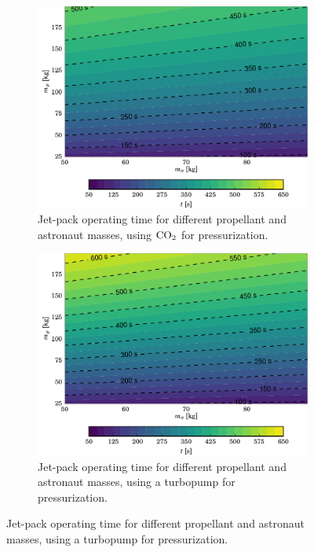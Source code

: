 \documentclass[twocolumn]{article}
\newcommand{\COtwo}{\textnormal{CO}_2}
\begin{document}
\begin{figure}
  \centering
  \begin{subfigure}{\textwidth}
    \includegraphics{img/delta_t_co2}
  \caption{Jet-pack operating time for different propellant and astronaut 
  masses, using $\COtwo$ for pressurization.}
    \label{fig:delta_t_co2}
  \end{subfigure}
  \begin{subfigure}{\textwidth}
    \includegraphics{img/delta_t_tp}
  \caption{Jet-pack operating time for different propellant and astronaut 
  masses, using a turbopump for pressurization.}
    \label{fig:delta_t_tp}
  \end{subfigure}
\end{figure}
\end{document}
